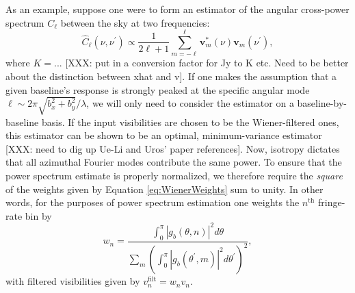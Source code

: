 \documentclass[twocolumn,apj,numberedappendix]{emulateapj}
\newcommand{\vis}{\mathbf{v}}
\begin{document}
As an example, suppose one were to form an estimator of the angular cross-power spectrum $C_\ell$ between the sky at two frequencies:
\begin{equation}
\label{eq:C_Ell}
\widehat{C}_\ell (\nu, \nu^\prime) \propto \frac{1}{2\ell + 1} \sum_{m=-\ell}^{\ell} \vis^*_m (\nu) \vis_m (\nu^\prime),
\end{equation}
where $K=...$ [XXX: put in a conversion factor for Jy to K etc. Need to be better about the distinction between xhat and v].  If one makes the assumption that a given baseline's response is strongly peaked at the specific angular mode $\ell \sim 2 \pi \sqrt{b_x^2+ b_y^2} / \lambda$, we will only need to consider the estimator on a baseline-by-baseline basis.  If the input visibilities are chosen to be the Wiener-filtered ones, this estimator can be shown to be an optimal, minimum-variance estimator [XXX: need to dig up Ue-Li and Uros' paper references].  Now, isotropy dictates that all azimuthal Fourier modes contribute the same power.  To ensure that the power spectrum estimate is properly normalized, we therefore require the \emph{square} of the weights given by Equation \eqref{eq:WienerWeights} sum to unity.  In other words, for the purposes of power spectrum estimation one weights the $n^\textrm{th}$ fringe-rate bin by
\begin{equation}
w_n = \frac{ \int_0^{\pi}  | g_b (\theta, n) |^2 d\theta}{\sum_m \left( \int_0^{\pi}  | g_b (\theta^\prime, m) |^2 d\theta^\prime \right)^2 },
\end{equation}
with filtered visibilities given by $v^\textrm{filt}_n = w_n v_n$.
\end{document}
